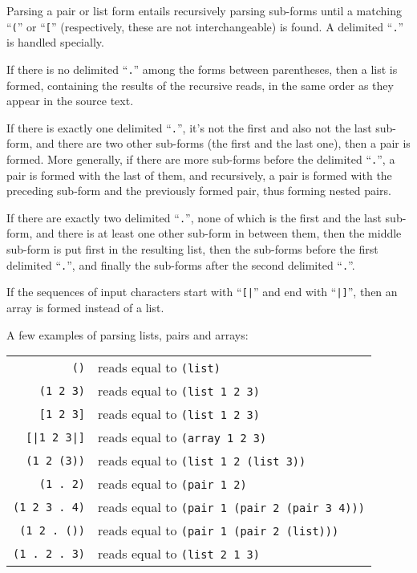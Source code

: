 Parsing a pair or list form entails recursively parsing sub-forms until a matching ``\lstinline!(!'' or ``\lstinline![!'' (respectively, these are not interchangeable) is found. A delimited ``\lstinline!.!'' is handled specially.

If there is no delimited ``\lstinline!.!'' among the forms between parentheses, then a list is formed, containing the results of the recursive reads, in the same order as they appear in the source text.

If there is exactly one delimited ``\lstinline!.!'', it's not the first and also not the last sub-form, and there are two other sub-forms (the first and the last one), then a pair is formed. More generally, if there are more sub-forms before the delimited ``\lstinline!.!'', a pair is formed with the last of them, and recursively, a pair is formed with the preceding sub-form and the previously formed pair, thus forming nested pairs.

If there are exactly two delimited ``\lstinline!.!'', none of which is the first and the last sub-form, and there is at least one other sub-form in between them, then the middle sub-form is put first in the resulting list, then the sub-forms before the first delimited ``\lstinline!.!'', and finally the sub-forms after the second delimited ``\lstinline!.!''. 

If the sequences of input characters start with ``\lstinline![|!'' and end with ``\lstinline!|]!'', then an array is formed instead of a list.


\example A few examples of parsing lists, pairs and arrays:

\begin{tabular}{ r l }
  \lstinline!()! & reads equal to \lstinline!(list)! \\
  \lstinline!(1 2 3)! & reads equal to \lstinline!(list 1 2 3)! \\
  \lstinline![1 2 3]! & reads equal to \lstinline!(list 1 2 3)! \\
  \lstinline![|1 2 3|]! & reads equal to \lstinline!(array 1 2 3)! \\
  \lstinline!(1 2 (3))! & reads equal to \lstinline!(list 1 2 (list 3))! \\
  \lstinline!(1 . 2)! & reads equal to \lstinline!(pair 1 2)! \\
  \lstinline!(1 2 3 . 4)! & reads equal to \lstinline!(pair 1 (pair 2 (pair 3 4)))! \\
  \lstinline!(1 2 . ())! & reads equal to \lstinline!(pair 1 (pair 2 (list)))! \\
  \lstinline!(1 . 2 . 3)! & reads equal to \lstinline!(list 2 1 3)! \\
\end{tabular}







